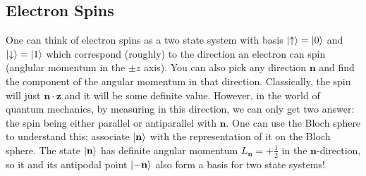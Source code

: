 \subsection{Electron Spins}
One can think of electron spins as a two state system with basis $\ket{\uparrow} = \ket{0}$ and $\ket{\downarrow} = \ket{1}$
which correspond (roughly) to the direction an electron can spin (anglular momentum in the $\pm z$ axis). You can also pick any direction $\mathbf{n}$
and find the component of the angular momentum in that direction. Classically, the spin will just $\mathbf{n} \cdot \mathbf{z}$ and it will be some definite value.
However, in the world of quantum mechanics, by measuring in this direction, we can only get two answer: the spin being either parallel or antiparallel with $\mathbf{n}$.
One can use the Bloch sphere to understand this; associate $\ket{\mathbf{n}}$ with the representation of it on the Bloch sphere.
The state $\ket{\mathbf{n}}$ has definite angular momentum $L_{\mathbf{n}} = + \frac{1}{2}$ in the $\mathbf{n}$-direction, so it and its antipodal point $\ket{- \mathbf{n}}$ also form a basis for two state systems!

